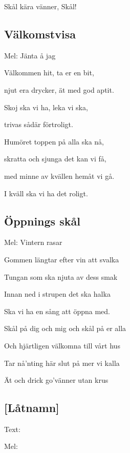 Skål kära vänner, Skål! \bigskip

\subsection{\textbf{Välkomstvisa}}

Mel: Jänta å jag\bigskip

Välkommen hit, ta er en bit,

njut era drycker, ät med god aptit.

Skoj ska vi ha, leka vi ska,

trivas sådär förtroligt. \bigskip

Humöret toppen på alla ska nå,

skratta och sjunga det kan vi få,

med minne av kvällen hemåt vi gå.

I kväll ska vi ha det roligt. \bigskip

\subsection{\textbf{Öppnings skål}}

Mel: Vintern rasar\bigskip


Gommen längtar efter vin att svalka

Tungan som ska njuta av dess smak

Innan ned i strupen det ska halka

Ska vi ha en sång att öppna med.\bigskip

Skål på dig och mig och skål på er alla

Och hjärtligen välkomna till vårt hus

Tar nå’nting här slut på mer vi kalla

Ät och drick go’vänner utan krus
\subsection{\textbf{[Låtnamn]}}

Text: 

Mel: 


\newpage